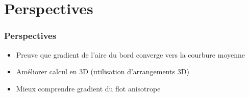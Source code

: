 \documentclass{beamer}
\begin{document}
\section{Perspectives}

\begin{frame}
    \frametitle{Perspectives}

    \begin{itemize}
        \item Preuve que gradient de l'aire du bord converge vers la courbure
            moyenne
        \item Améliorer calcul en 3D (utilisation d'arrangements 3D)
        \item Mieux comprendre gradient du flot anisotrope
    \end{itemize}
\end{frame}

\end{document}
